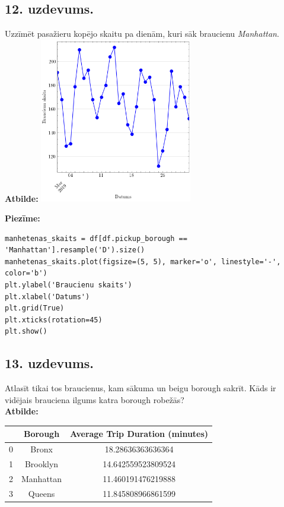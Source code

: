 \documentclass[12pt]{article}
\begin{document}
\subsection*{12. uzdevums.} Uzzīmēt pasažieru kopējo skaitu pa dienām, kuri sāk braucienu \textit{Manhattan}.\\
\textbf{Atbilde:} \includegraphics[width=0.5\textwidth]{12.udz.png}

\noindent \textbf{Piezīme:}
\begin{verbatim}
manhetenas_skaits = df[df.pickup_borough == 'Manhattan'].resample('D').size()
manhetenas_skaits.plot(figsize=(5, 5), marker='o', linestyle='-', color='b')
plt.ylabel('Braucienu skaits')
plt.xlabel('Datums')
plt.grid(True)
plt.xticks(rotation=45)
plt.show()
\end{verbatim}
\subsection*{13. uzdevums.} Atlasīt tikai tos braucienus, kam sākuma un beigu borough sakrīt. Kāds ir vidējais brauciena ilgums katra borough robežās?\\
\textbf{Atbilde:} \begin{table}[ht]
\centering
\begin{tabular}{ccc}
\hline
 & Borough   & Average Trip Duration (minutes) \\ \hline
0     & Bronx     & 18.28636363636364              \\
1     & Brooklyn  & 14.642559523809524             \\
2     & Manhattan & 11.460191476219888             \\
3     & Queens    & 11.845808966861599             \\ \hline
\end{tabular}
\label{tab:trip_duration}
\end{table}
\end{document}
